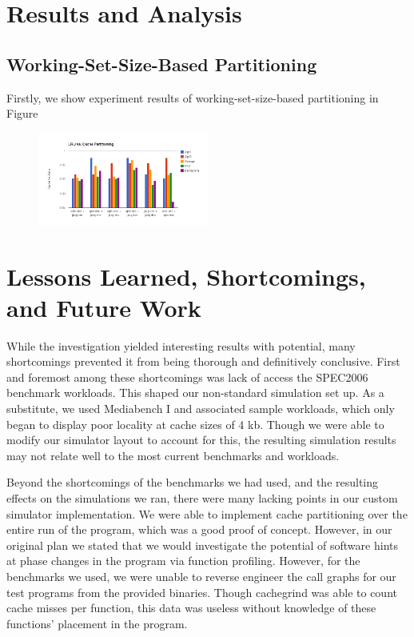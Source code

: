 \documentclass{acm_proc_article-sp}
\begin{document}
\section{Results and Analysis}
\label{sec:results}

\subsection{Working-Set-Size-Based Partitioning}

Firstly, we show experiment results of working-set-size-based partitioning in 
Figure~

\begin{figure}
  \includegraphics[width=0.5\textwidth]{figs/work_set_size_hit_ratio.png}
\end{figure}

\section{Lessons Learned, Shortcomings, and Future Work}
 
While the investigation yielded interesting results with potential, many shortcomings prevented it from being thorough and definitively conclusive. First and foremost among these shortcomings was lack of access the SPEC2006 benchmark workloads. This shaped our non-standard simulation set up. As a substitute, we used Mediabench I and associated sample workloads, which only began to display poor locality at cache sizes of 4 kb. Though we were able to modify our simulator layout to account for this, the resulting simulation results may not relate well to the most current benchmarks and workloads.
 
Beyond the shortcomings of the benchmarks we had used, and the resulting effects on the simulations we ran, there were many lacking points in our custom simulator implementation. We were able to implement cache partitioning over the entire run of the program, which was a good proof of concept. However, in our original plan we stated that we would investigate the potential of software hints at phase changes in the program via function profiling. However, for the benchmarks we used, we were unable to reverse engineer the call graphs for our test programs from the provided binaries. Though cachegrind was able to count cache misses per function, this data was useless without knowledge of these functions’ placement in the program.
 
\end{document}
